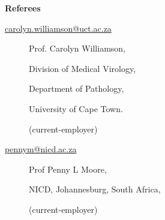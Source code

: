 \begin{description}\item[] \begin{description}\item[] {\bf  Referees  }
\begin{description}
\item[]

\item[\url{carolyn.williamson@uct.ac.za}] 
 \item[] Prof. Carolyn Williamson, 
 \item[] Division of Medical Virology, 
 \item[] Department of Pathology, 
 \item[] University of Cape Town.
\item[] (current-employer)
\item[]

\item[\url{pennym@nicd.ac.za}] 
 \item[] Prof Penny L Moore,
 \item[] NICD, Johannesburg, South Africa,
 \item[] (current-employer) 
\item[]


%


 \end{description}
\end{description}
\end{description}

